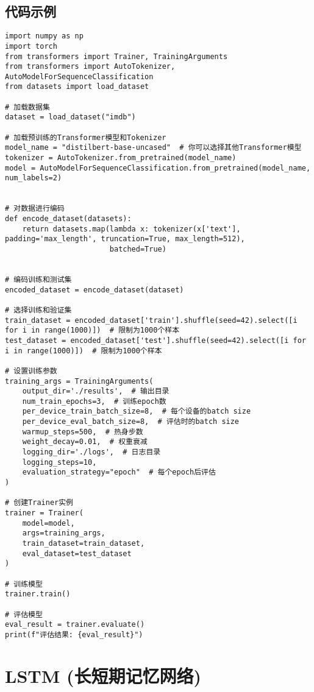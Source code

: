 \subsection*{代码示例}
\begin{lstlisting}
import numpy as np
import torch
from transformers import Trainer, TrainingArguments
from transformers import AutoTokenizer, AutoModelForSequenceClassification
from datasets import load_dataset

# 加载数据集
dataset = load_dataset("imdb")

# 加载预训练的Transformer模型和Tokenizer
model_name = "distilbert-base-uncased"  # 你可以选择其他Transformer模型
tokenizer = AutoTokenizer.from_pretrained(model_name)
model = AutoModelForSequenceClassification.from_pretrained(model_name, num_labels=2)


# 对数据进行编码
def encode_dataset(datasets):
    return datasets.map(lambda x: tokenizer(x['text'], padding='max_length', truncation=True, max_length=512),
                        batched=True)


# 编码训练和测试集
encoded_dataset = encode_dataset(dataset)

# 选择训练和验证集
train_dataset = encoded_dataset['train'].shuffle(seed=42).select([i for i in range(1000)])  # 限制为1000个样本
test_dataset = encoded_dataset['test'].shuffle(seed=42).select([i for i in range(1000)])  # 限制为1000个样本

# 设置训练参数
training_args = TrainingArguments(
    output_dir='./results',  # 输出目录
    num_train_epochs=3,  # 训练epoch数
    per_device_train_batch_size=8,  # 每个设备的batch size
    per_device_eval_batch_size=8,  # 评估时的batch size
    warmup_steps=500,  # 热身步数
    weight_decay=0.01,  # 权重衰减
    logging_dir='./logs',  # 日志目录
    logging_steps=10,
    evaluation_strategy="epoch"  # 每个epoch后评估
)

# 创建Trainer实例
trainer = Trainer(
    model=model,
    args=training_args,
    train_dataset=train_dataset,
    eval_dataset=test_dataset
)

# 训练模型
trainer.train()

# 评估模型
eval_result = trainer.evaluate()
print(f"评估结果: {eval_result}")

\end{lstlisting}


\section{LSTM (长短期记忆网络)}
